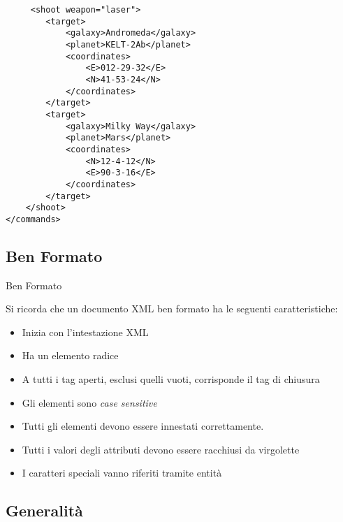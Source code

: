 \documentclass{beamer}
\begin{document}
	\begin{frame}[containsverbatim]
	\begin{lstlisting}
	 <shoot weapon="laser">
        <target>
            <galaxy>Andromeda</galaxy>
            <planet>KELT-2Ab</planet>
            <coordinates>
                <E>012-29-32</E>
                <N>41-53-24</N>
            </coordinates>
        </target>
        <target>
            <galaxy>Milky Way</galaxy>
            <planet>Mars</planet>
            <coordinates>
                <N>12-4-12</N>
                <E>90-3-16</E>
            </coordinates>
        </target>
    </shoot>
</commands>
	\end{lstlisting}
	\end{frame}
    
    \subsection{Ben Formato}  
    \begin{frame}{Ben Formato}
    
    Si ricorda che un documento XML ben formato ha le seguenti caratteristiche:
    \begin{itemize}
    \item Inizia con l'intestazione XML
    \item Ha un elemento radice
    \item A tutti i tag aperti, esclusi quelli vuoti, corrisponde il tag di chiusura
    \item Gli elementi sono \textit{case sensitive}
    \item Tutti gli elementi devono essere innestati correttamente.
    \item Tutti i valori degli attributi devono essere racchiusi da virgolette
    \item I caratteri speciali vanno riferiti tramite entità    
	\end{itemize}       
	\end{frame}
    
    \subsection{Generalità}
    
\end{document}
